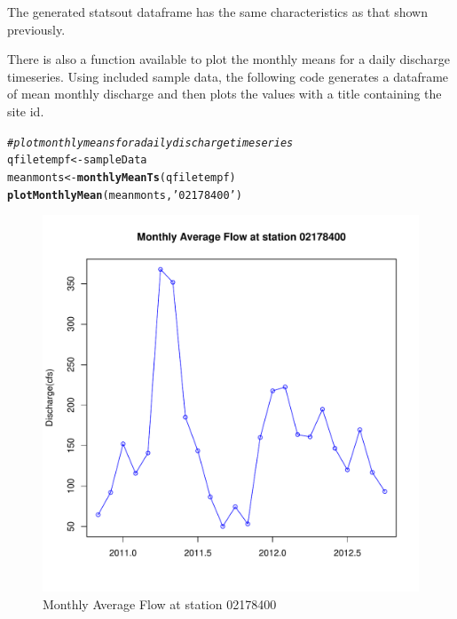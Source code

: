 \documentclass[a4paper,11pt]{article}\usepackage[]{graphicx}\usepackage[]{color}
\makeatletter
\def\maxwidth{ %
  \ifdim\Gin@nat@width>\linewidth
    \linewidth
  \else
    \Gin@nat@width
  \fi
}
\newcommand{\hlstr}[1]{\textcolor[rgb]{0.192,0.494,0.8}{#1}}%
\newcommand{\hlcom}[1]{\textcolor[rgb]{0.678,0.584,0.686}{\textit{#1}}}%
\newcommand{\hlstd}[1]{\textcolor[rgb]{0.345,0.345,0.345}{#1}}%
\newcommand{\hlkwb}[1]{\textcolor[rgb]{0.69,0.353,0.396}{#1}}%
\newcommand{\hlkwd}[1]{\textcolor[rgb]{0.737,0.353,0.396}{\textbf{#1}}}%
\newenvironment{kframe}{%
 \def\at@end@of@kframe{}%
 \ifinner\ifhmode%
  \def\at@end@of@kframe{\end{minipage}}%
  \begin{minipage}{\columnwidth}%
 \fi\fi%
 \def\FrameCommand##1{\hskip\@totalleftmargin \hskip-\fboxsep
 \colorbox{shadecolor}{##1}\hskip-\fboxsep
     \hskip-\linewidth \hskip-\@totalleftmargin \hskip\columnwidth}%
 \MakeFramed {\advance\hsize-\width
   \@totalleftmargin\z@ \linewidth\hsize
   \@setminipage}}%
 {\par\unskip\endMakeFramed%
 \at@end@of@kframe}
\newenvironment{knitrout}{}{} %
\makeatother
\begin{document}
The generated statsout dataframe has the same characteristics as that shown previously.

There is also a function available to plot the monthly means for a daily discharge timeseries. Using included sample data, the following code generates a dataframe of mean monthly discharge and then plots the values with a title containing the site id. 

\begin{knitrout}
\color{fgcolor}\begin{kframe}
\begin{alltt}
\hlcom{# plot monthly means for a daily discharge timeseries}
\hlstd{qfiletempf}\hlkwb{<-}\hlstd{sampleData}
\hlstd{meanmonts}\hlkwb{<-}\hlkwd{monthlyMeanTs}\hlstd{(qfiletempf)}
\hlkwd{plotMonthlyMean}\hlstd{(meanmonts,}\hlstr{'02178400'}\hlstd{)}
\end{alltt}
\end{kframe}\begin{figure}[]

\includegraphics[width=\maxwidth]{figure/plotMonthlyMeans} \caption[Monthly Average Flow at station 02178400]{Monthly Average Flow at station 02178400\label{fig:plotMonthlyMeans}}
\end{figure}


\end{knitrout}
\end{document}

